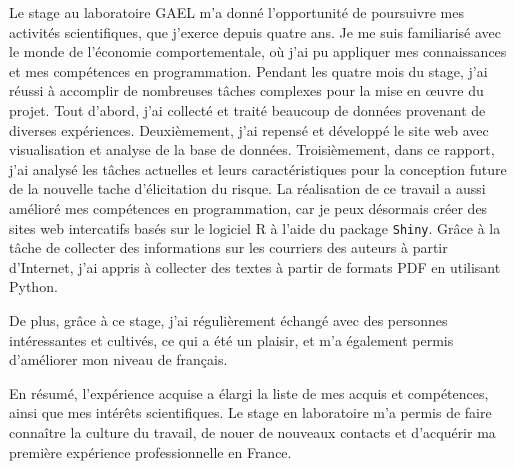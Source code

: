 \documentclass[12pt]{article}
\begin{document}
Le stage au laboratoire GAEL m'a donné l'opportunité de poursuivre mes
activités scientifiques, que j'exerce depuis quatre ans. Je me suis
familiarisé avec le monde de l'économie comportementale, où j'ai pu
appliquer mes connaissances et mes compétences en programmation. Pendant
les quatre mois du stage, j'ai réussi à accomplir de nombreuses tâches
complexes pour la mise en œuvre du projet. Tout d'abord, j'ai collecté
et traité beaucoup de données provenant de diverses expériences.
Deuxièmement, j'ai repensé et développé le site web avec visualisation
et analyse de la base de données. Troisièmement, dans ce rapport, j'ai
analysé les tâches actuelles et leurs caractéristiques pour la
conception future de la nouvelle tache d'élicitation du risque. La
réalisation de ce travail a aussi amélioré mes compétences en
programmation, car je peux désormais créer des sites web intercatifs
basés sur le logiciel R à l'aide du package \texttt{Shiny}. Grâce à la
tâche de collecter des informations sur les courriers des auteurs à
partir d'Internet, j'ai appris à collecter des textes à partir de
formats PDF en utilisant Python.

De plus, grâce à ce stage, j'ai régulièrement échangé avec des personnes
intéressantes et cultivés, ce qui a été un plaisir, et m'a également
permis d'améliorer mon niveau de français.

En résumé, l'expérience acquise a élargi la liste de mes acquis et
compétences, ainsi que mes intérêts scientifiques. Le stage en
laboratoire m'a permis de faire connaître la culture du travail, de
nouer de nouveaux contacts et d'acquérir ma première expérience
professionnelle en France.



\end{document}
